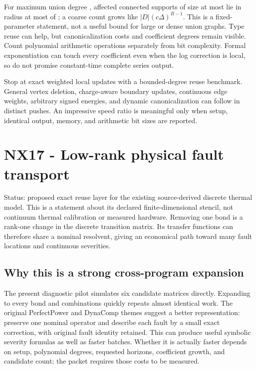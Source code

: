 \documentclass[
  11pt,
  a4paper,
]{report}
\let\nxtexttt\texttt
\renewcommand{\texttt}[1]{\nxtexttt{\seqsplit{#1}}}
\begin{document}
For maximum union degree \texttt{Delta}, affected connected supports of
size at most \texttt{R} lie in radius at most \texttt{R-1} of
\texttt{D}; a coarse count grows like
\(\lvert D\rvert(c \Delta)^{R-1}\). This is a fixed-parameter statement,
not a useful bound for large \texttt{R} or dense union graphs. Type
reuse can help, but canonicalization costs and coefficient degrees
remain visible. Count polynomial arithmetic operations separately from
bit complexity. Formal exponentiation can touch every coefficient even
when the log correction is local, so do not promise constant-time
complete series output.

Stop at exact weighted local updates with a bounded-degree reuse
benchmark. General vertex deletion, charge-aware boundary updates,
continuous edge weights, arbitrary signed energies, and dynamic
canonicalization can follow in distinct pushes. An impressive speed
ratio is meaningful only when setup, identical output, memory, and
arithmetic bit sizes are reported.

\hypertarget{nx17---low-rank-physical-fault-transport}{%
\chapter{NX17 - Low-rank physical fault
transport}\label{nx17---low-rank-physical-fault-transport}}

Status: proposed exact reuse layer for the existing source-derived
discrete thermal model. This is a statement about its declared
finite-dimensional stencil, not continuum thermal calibration or
measured hardware. Removing one bond is a rank-one change in the
discrete transition matrix. Its transfer functions can therefore share a
nominal resolvent, giving an economical path toward many fault locations
and continuous severities.

\hypertarget{why-this-is-a-strong-cross-program-expansion}{%
\section{Why this is a strong cross-program
expansion}\label{why-this-is-a-strong-cross-program-expansion}}

The present diagnostic pilot simulates six candidate matrices directly.
Expanding to every bond and combinations quickly repeats almost
identical work. The original PerfectPower and DynaComp themes suggest a
better representation: preserve one nominal operator and describe each
fault by a small exact correction, with original fault identity
retained. This can produce useful symbolic severity formulas as well as
faster batches. Whether it is actually faster depends on setup,
polynomial degrees, requested horizons, coefficient growth, and
candidate count; the packet requires those costs to be measured.
\end{document}
